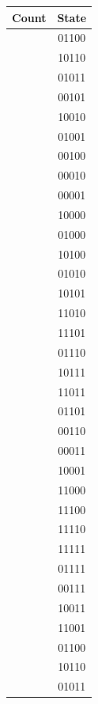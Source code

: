 \documentclass{article}
\begin{document}
\begin{center}
\begin{tabular}{c|c}
Count & State \\ \hline
[22] & 01100 \\ \hline
[23] & 10110 \\ \hline
[24] & 01011 \\ \hline
[25] & 00101 \\ \hline
[26] & 10010 \\ \hline
[27] & 01001 \\ \hline
[28] & 00100 \\ \hline
[29] & 00010 \\ \hline
[30] & 00001 \\ \hline
[31] & 10000 \\ \hline
[32] & 01000 \\ \hline
[33] & 10100 \\ \hline
[34] & 01010 \\ \hline
[35] & 10101 \\ \hline
[36] & 11010 \\ \hline
[37] & 11101 \\ \hline
[38] & 01110 \\ \hline
[39] & 10111 \\ \hline
[40] & 11011 \\ \hline
[41] & 01101 \\ \hline
[42] & 00110 \\ \hline
[43] & 00011 \\ \hline
[44] & 10001 \\ \hline
[45] & 11000 \\ \hline
[46] & 11100 \\ \hline
[47] & 11110 \\ \hline
[48] & 11111 \\ \hline
[49] & 01111 \\ \hline
[50] & 00111 \\ \hline
[51] & 10011 \\ \hline
[52] & 11001 \\ \hline
[53] & 01100 \\ \hline
[54] & 10110 \\ \hline
[55] & 01011 \\ \hline
\end{tabular}
\end{center}
\end{document}

